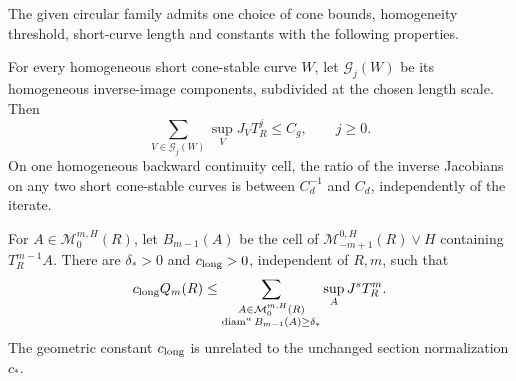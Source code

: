 \begin{lemma}\label{lem:v100-geometric}
The given circular family admits one choice of cone bounds,
homogeneity threshold, short-curve length and constants with the
following properties.

For every homogeneous short cone-stable curve $W$, let
$\mathcal G_j(W)$ be its homogeneous inverse-image components,
subdivided at the chosen length scale. Then
\begin{equation}\label{eq:v100-curve-growth}
 \sum_{V\in\mathcal G_j(W)}\sup_V J_VT_R^j\le C_g,
                                      \qquad j\ge0.
\end{equation}
On one homogeneous backward continuity cell, the ratio of the
inverse Jacobians on any two short cone-stable curves is between
$C_d^{-1}$ and $C_d$, independently of the iterate.

For $A\in\mathcal M_0^{m,H}(R)$, let $B_{m-1}(A)$ be the cell of
$\mathcal M_{-m+1}^{0,H}(R)\vee H$ containing $T_R^{m-1}A$.
There are $\delta_*>0$ and $c_{\rm long}>0$, independent of $R,m$, such that
\begin{equation}\label{eq:v100-long-cell}
 c_{\rm long} Q_m(R)\le
 \sum_{\substack{A\in\mathcal M_0^{m,H}(R)\\
             \operatorname{diam}^u B_{m-1}(A)\ge\delta_*}}
                          \sup_A J^sT_R^m.
\end{equation}
The geometric constant $c_{\rm long}$ is unrelated to the unchanged
section normalization $c_*$.
\end{lemma}
